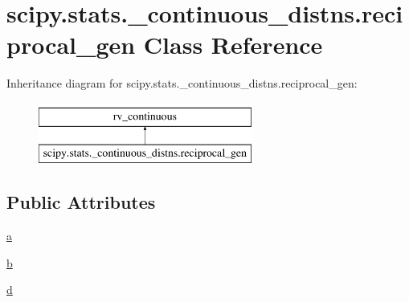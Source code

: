 \hypertarget{classscipy_1_1stats_1_1__continuous__distns_1_1reciprocal__gen}{}\section{scipy.\+stats.\+\_\+continuous\+\_\+distns.\+reciprocal\+\_\+gen Class Reference}
\label{classscipy_1_1stats_1_1__continuous__distns_1_1reciprocal__gen}
Inheritance diagram for scipy.\+stats.\+\_\+continuous\+\_\+distns.\+reciprocal\+\_\+gen\+:\begin{figure}[H]
\begin{center}
\leavevmode
\includegraphics[height=2.000000cm]{classscipy_1_1stats_1_1__continuous__distns_1_1reciprocal__gen}
\end{center}
\end{figure}
\subsection*{Public Attributes}
\begin{DoxyCompactItemize}
\item 
\hyperlink{classscipy_1_1stats_1_1__continuous__distns_1_1reciprocal__gen_a447cf09887de7f40cdab0fb6d4e96691}{a}
\item 
\hyperlink{classscipy_1_1stats_1_1__continuous__distns_1_1reciprocal__gen_abde739e6bb98fe8390e1c31a6c28105a}{b}
\item 
\hyperlink{classscipy_1_1stats_1_1__continuous__distns_1_1reciprocal__gen_af1b922b39be7f744fcb9ce7cd81a64bd}{d}
\end{DoxyCompactItemize}


